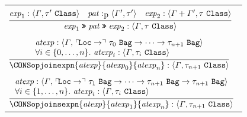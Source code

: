 \documentclass[final]{article}
\begin{document}
\begin{figure}[t]
\begin{small}
\begin{center}
\begin{tabular}{llll}
    \\
    &&&
    \\

    \multicolumn{4}{l}{
      $\MEMinferd
      {\MEMtyping{\CONSbindingexp{\METAexp_1}{\METApat}{\METAexp_2}}{\METAityenv}{\CONSconsty{\METAity}{\CONSclassty}}}
      {\MEMtyping{\METAexp_1}{\METAityenv}{\CONSconsty{\METAity'}{\CONSclassty}}}
      {\MEMtypingpat{\METApat}{\METAityenv'}{\METAity'}}
      {\MEMtyping{\METAexp_2}{\MEMplusenv{\METAityenv}{\METAityenv'}}{\CONSconsty{\METAity}{\CONSclassty}}}$
    }

    \\
    &&&
    \\

    \multicolumn{4}{l}{
      $\MEMinfercc
      {\MEMtyping
        {\CONSopjoinexpn{\METAatexp}{\METAatexp_0}{\METAatexp_n}}
        {\METAityenv}
        {\CONSconsty{\METAity_{n+1}}{\CONSclassty}}
      }
      {\MEMtyping
        {\METAatexp}
        {\METAityenv}
        {\CONSoparrowty
          {\CONSlocty}
          {\CONSarrowty
            {\CONSconsty{\METAity_0}{\CONSbagty}}
            {\CONSarrowty{\cdots}{\CONSconsty{\METAity_{n+1}}{\CONSbagty}}}
          }
        }
      }
      {\forallexp{i\in\{0,\dots,n\}}{\MEMtyping{\METAatexp_i}{\METAityenv}{\CONSconsty{\METAity_i}{\CONSclassty}}}}$
    }

    \\
    &&&
    \\

    \multicolumn{4}{l}{
      $\MEMinfercc
      {\MEMtyping
        {\CONSopjoinsexpn{\METAatexp}{\METAatexp_1}{\METAatexp_n}}
        {\METAityenv}
        {\CONSconsty{\METAity_{n+1}}{\CONSclassty}}
      }
      {\MEMtyping
        {\METAatexp}
        {\METAityenv}
        {\CONSoparrowty
          {\CONSlocty}
          {\CONSarrowty
            {\CONSconsty{\METAity_1}{\CONSbagty}}
            {\CONSarrowty{\cdots}{\CONSarrowty{\CONSconsty{\METAity_{n+1}}{\CONSbagty}}{\CONSconsty{\METAity_{n+1}}{\CONSbagty}}}}
          }
        }
      }
      {\forallexp{i\in\{1,\dots,n\}}{\MEMtyping{\METAatexp_i}{\METAityenv}{\CONSconsty{\METAity_i}{\CONSclassty}}}}$
    }




\end{tabular}
\end{center}
\end{small}
\end{figure}
\end{document}
